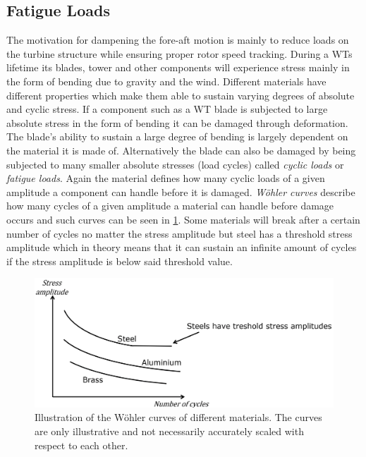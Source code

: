 \subsection{Fatigue Loads}
The motivation for dampening the fore-aft motion is mainly to reduce loads on the turbine structure while ensuring proper rotor speed tracking. During a WTs lifetime its blades, tower and other components will experience stress mainly in the form of bending due to gravity and the wind. Different materials have different properties which make them able to sustain varying degrees of absolute and cyclic stress. If a component such as a WT blade is subjected to large absolute stress in the form of bending it can be damaged through deformation. The blade's ability to sustain a large degree of bending is largely dependent on the material it is made of. Alternatively the blade can also be damaged by being subjected to many smaller absolute stresses (load cycles) called \textit{cyclic loads} or \textit{fatigue loads}. Again the material defines how many cyclic loads of a given amplitude a component can handle before it is damaged. \textit{Wöhler curves} describe how many cycles of a given amplitude a material can handle before damage occurs and such curves can be seen in \cref{fig:woher_curve}. Some materials will break after a certain number of cycles no matter the stress amplitude but steel has a threshold stress amplitude which in theory means that it can sustain an infinite amount of cycles if the stress amplitude is below said threshold value.

\begin{figure}[ht]
	\centering
	\includegraphics[width=0.6\linewidth]{Graphics/WohlerCurve.png}
	\caption{Illustration of the Wöhler curves of different materials. The curves are only illustrative and not necessarily accurately scaled with respect to each other.}
	\label{fig:woher_curve}
\end{figure}

